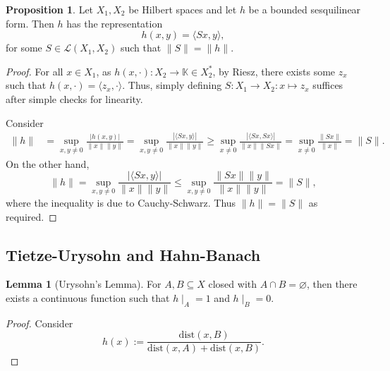 \documentclass[]{article}
\theoremstyle{definition}
\theoremstyle{definition}
\newtheorem{lemma}{Lemma}[section]
\newtheorem{proposition}{Proposition}[section]
\begin{document}
\begin{proposition}
  Let \(X_1, X_2\) be Hilbert spaces and let \(h\) be a bounded sesquilinear 
  form. Then \(h\) has the representation 
  \[h(x, y) = \langle Sx, y \rangle,\]
  for some \(S \in \mathcal{L}(X_1, X_2)\) such that \(\|S\| = \|h\|\).
\end{proposition}
\begin{proof}
  For all \(x \in X_1\), as \(h(x, \cdot) : X_2 \to \mathbb{K} \in X_2^*\), 
  by Riesz, there exists some \(z_x\) such that \(h(x, \cdot) = 
  \langle z_x, \cdot \rangle\). Thus, simply defining 
  \(S : X_1 \to X_2 : x \mapsto z_x\) suffices after simple checks for linearity.

  Consider 
  \[\begin{split}
    \|h\| & = \sup_{x, y \neq 0} \frac{|h(x, y)|}{\|x\|\|y\|} 
      = \sup_{x, y \neq 0} \frac{|\langle Sx, y \rangle|}{\|x\|\|y\|}
      \ge \sup_{x \neq 0} \frac{|\langle Sx, Sx \rangle|}{\|x\|\|Sx\|}
      = \sup_{x \neq 0} \frac{\|Sx\|}{\|x\|} = \|S\|.
  \end{split}\]
  On the other hand, 
  \[\|h\| = \sup_{x, y \neq 0} \frac{|\langle Sx, y \rangle|}{\|x\|\|y\|}
    \le \sup_{x, y \neq 0} \frac{\|Sx\|\|y\|}{\|x\|\|y\|} = \|S\|,\]
  where the inequality is due to Cauchy-Schwarz. Thus \(\|h\| = \|S\|\) as 
  required.
\end{proof}

\subsection{Tietze-Urysohn and Hahn-Banach}

\begin{lemma}[Urysohn's Lemma]
  For \(A, B \subseteq X\) closed with \(A \cap B = \varnothing\), then there 
  exists a continuous function such that \(h\mid_A = 1\) and \(h\mid_B = 0\).
\end{lemma}
\begin{proof}
  Consider 
  \[h(x) := \frac{\text{dist}(x, B)}{\text{dist}(x, A) + \text{dist}(x, B)}.\]
\end{proof}
\end{document}
